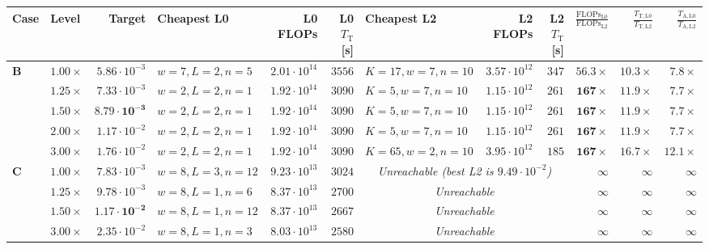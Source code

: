 \begin{table}[!htbp]
{\begin{tabular}{@{}llrlrrlrrrrr@{}}
\toprule
\textbf{Case} & \textbf{Level} & \textbf{Target} & \textbf{Cheapest L0} & \textbf{L0 FLOPs} & \textbf{L0 $T_{\mathrm{T}}$[s]} & \textbf{Cheapest L2} & \textbf{L2 FLOPs} & \textbf{L2 $T_{\mathrm{T}}$[s]} & $\frac{\text{FLOPs}_{\mathrm{L0}}}{\text{FLOPs}_{\mathrm{L2}}}$ & $\frac{T_{\mathrm{T,L0}}}{T_{\mathrm{T,L2}}}$ & $\frac{T_{\mathrm{A,L0}}}{T_{\mathrm{A,L2}}}$ \\
\midrule
\textbf{B}
 & $1.00\times$ & $5.86\cdot 10^{-3}$ & $w{=}7,L{=}2,n{=}5$ & $2.01\cdot 10^{14}$ & $3556$ & $K{=}17,w{=}7,n{=}10$ & $3.57\cdot 10^{12}$ & $347$ & $\mathbf{56.3\times}$ & $\mathbf{10.3\times}$ & $7.8\times$ \\
 & $1.25\times$ & $7.33\cdot 10^{-3}$ & $w{=}2,L{=}2,n{=}1$ & $1.92\cdot 10^{14}$ & $3090$ & $K{=}5,w{=}7,n{=}10$  & $1.15\cdot 10^{12}$ & $261$ & $\mathbf{167\times}$  & $\mathbf{11.9\times}$ & $7.7\times$ \\
 & $\mathbf{1.50\times}$ & $\mathbf{8.79\cdot 10^{-3}}$ & $w{=}2,L{=}2,n{=}1$ & $1.92\cdot 10^{14}$ & $3090$ & $K{=}5,w{=}7,n{=}10$  & $1.15\cdot 10^{12}$ & $261$ & $\mathbf{167\times}$  & $\mathbf{11.9\times}$ & $7.7\times$ \\
 & $2.00\times$ & $1.17\cdot 10^{-2}$ & $w{=}2,L{=}2,n{=}1$ & $1.92\cdot 10^{14}$ & $3090$ & $K{=}5,w{=}7,n{=}10$  & $1.15\cdot 10^{12}$ & $261$ & $\mathbf{167\times}$  & $\mathbf{11.9\times}$ & $7.7\times$ \\
 & $3.00\times$ & $1.76\cdot 10^{-2}$ & $w{=}2,L{=}2,n{=}1$ & $1.92\cdot 10^{14}$ & $3090$ & $K{=}65,w{=}2,n{=}10$ & $3.95\cdot 10^{12}$ & $185$ & $\mathbf{167\times}$  & $\mathbf{16.7\times}$ & $12.1\times$ \\
\midrule
\textbf{C}
 & $1.00\times$ & $7.83\cdot 10^{-3}$ & $w{=}8,L{=}3,n{=}12$ & $9.23\cdot 10^{13}$ & $3024$ & \multicolumn{3}{c}{\emph{Unreachable (best L2 is $9.49\cdot 10^{-2}$)}} & $\infty$ & $\infty$ & $\infty$ \\
 & $1.25\times$ & $9.78\cdot 10^{-3}$ & $w{=}8,L{=}1,n{=}6$  & $8.37\cdot 10^{13}$ & $2700$ & \multicolumn{3}{c}{\emph{Unreachable}} & $\infty$ & $\infty$ & $\infty$ \\
 & $\mathbf{1.50\times}$ & $\mathbf{1.17\cdot 10^{-2}}$ & $w{=}8,L{=}1,n{=}12$ & $8.37\cdot 10^{13}$ & $2667$ & \multicolumn{3}{c}{\emph{Unreachable}} & $\infty$ & $\infty$ & $\infty$ \\
 & $3.00\times$ & $2.35\cdot 10^{-2}$ & $w{=}8,L{=}1,n{=}3$  & $8.03\cdot 10^{13}$ & $2580$ & \multicolumn{3}{c}{\emph{Unreachable}} & $\infty$ & $\infty$ & $\infty$ \\
\bottomrule
\end{tabular}
}
\end{table}

